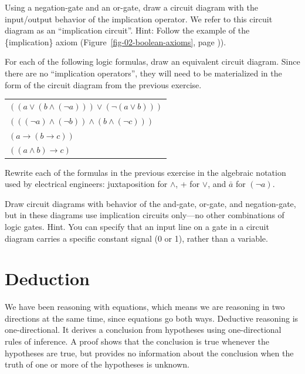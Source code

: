 \begin{ExerciseList}
\Exercise Using a negation-gate and an or-gate, draw a circuit diagram with the input/output behavior of the implication operator.
We refer to this circuit diagram as an ``implication circuit''.
Hint: Follow the example of the \{implication\} axiom
(Figure~\ref{fig-02-boolean-axioms}, page \pageref{fig-02-boolean-axioms})).

\Exercise For each of the following logic formulas, draw an equivalent circuit diagram.
Since there are no ``implication operators'', they will need to be materialized
in the form of the circuit diagram from the previous exercise.
\begin{center}
\begin{tabular}{l}
$((a \vee (b \wedge (\neg a))) \vee (\neg (a \vee b)))$ \\
$(((\neg a) \wedge (\neg b)) \wedge (b \wedge (\neg c)))$ \\
$(a \rightarrow (b \rightarrow c))$ \\
$((a \wedge b) \rightarrow c)$ \\
\end{tabular}
\end{center}

\Exercise Rewrite each of the formulas in the previous exercise
in the algebraic notation used by electrical engineers:
juxtaposition for $\wedge$, + for $\vee$, and $\bar{a}$ for $(\neg a)$.

\Exercise Draw circuit diagrams with behavior of the and-gate, or-gate, and negation-gate,
but in these diagrams use implication circuits only---no other combinations of logic gates.
Hint. You can specify that an input line on a gate in a circuit diagram 
carries a specific constant signal (0 or 1), rather than a variable.
\end{ExerciseList}


\section{Deduction}

We have been reasoning with equations, which means we are reasoning in two directions
at the same time, since equations go both ways. Deductive reasoning is one-directional.
It derives a conclusion from hypotheses using one-directional rules of inference.
A proof shows that the conclusion is true whenever the hypotheses are true, but provides
no information about the conclusion when the truth of one or more of the hypotheses is
unknown.

